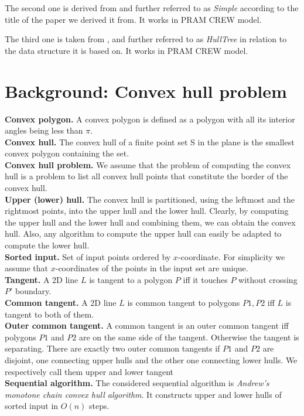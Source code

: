 \documentclass[letterpaper]{article}
\newcommand{\mypar}[1]{{\bf #1.}}
\theoremstyle{definition}
\begin{document}
The second one is derived from \cite{SimpleParallel} and further referred to as \textit{Simple} according to the title of the paper we derived it from.
It works in PRAM CREW model.
 
The third one is taken from \cite{HullTree}, and further referred to as \textit{HullTree} in relation to the data structure it is based on.
It works in PRAM CREW model.
     
\section{Background: Convex hull problem}\label{sec:background}

\mypar{Convex polygon} A convex polygon is defined as a polygon with all its interior angles being less than $\pi$.\\
\mypar{Convex hull}
The convex hull of a finite point set S in the plane is the smallest convex polygon containing the set.\\
\mypar{Convex hull problem}
We assume that the problem of computing the convex hull is a problem to list all convex hull points that constitute the border of the convex hull.\\
\mypar{Upper (lower) hull}
The convex hull is partitioned, using the leftmost and the rightmost points, into the upper hull and the lower hull. 
Clearly, by computing the upper hull and the lower hull and combining them, we can obtain the convex hull. 
Also, any algorithm to compute the upper hull can easily be adapted to compute the lower hull.\\
\mypar{Sorted input} 
Set of input points ordered by $x$-coordinate. 
For simplicity we assume that $x$-coordinates of the points in the input set are unique.\\
\mypar{Tangent} 
 A 2D line $L$ is tangent to a polygon $P$ iff it touches $P$ without crossing $P'$ boundary.\\
\mypar{Common tangent} 
A 2D line $L$ is common tangent to polygons $P1, P2$ iff $L$ is tangent to both of them.\\
\mypar{Outer common tangent}
A common tangent is an outer common tangent iff polygons $P1$ and $P2$ are on the same side of the tangent.
Otherwise the tangent is separating.
There are exactly two outer common tangents if $P1$ and $P2$ are disjoint, one connecting upper hulls and the other one connecting lower hulls. \cite{DBLP:journals/corr/Abrahamsen15}
We respectively call them upper and lower tangent\\
\mypar{Sequential algorithm}
The considered sequential algorithm is \textit{Andrew's monotone chain convex hull algorithm}. It constructs upper and lower hulls of sorted input in $O(n)$ steps. \cite{DBLP:journals/ipl/Andrew79} 
\end{document}

